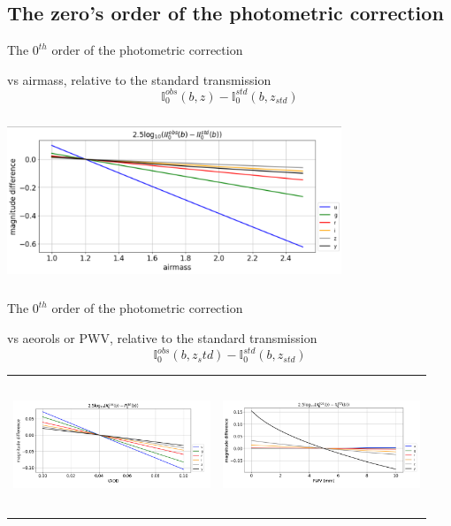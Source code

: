 \documentclass{beamer}
\begin{document}
\subsection{The zero's order of the photometric correction}
\begin{frame}{The $0^{th}$ order of the photometric correction}
\begin{alertblock}{vs airmass, relative to the standard transmission}
\begin{equation}
\mathbb{I}^{obs}_{0}(b,z) - \mathbb{I}^{std}_{0}(b,z_{std})
\end{equation}
\end{alertblock}
\includegraphics[width=10cm, height=5cm]{figs/Integrals_II/Integrals_II0_vs_airmass.png}
\end{frame}


\begin{frame}{The $0^{th}$ order of the photometric correction}
\begin{alertblock}{vs aeorols or PWV, relative to the standard transmission}
\begin{equation}
\mathbb{I}^{obs}_{0}(b,z_std) - \mathbb{I}^{std}_{0}(b,z_{std})
\end{equation}
\end{alertblock}
\begin{tabular}{cc}
\includegraphics[width=5.9cm, height=4cm]{figs/Integrals_II/Integrals_II0_vs_VAOD.png} & \includegraphics[width=5.9cm, height=4cm]{figs/Integrals_II/Integrals_II0_vs_PWV.png}
\end{tabular}
\end{frame}
\end{document}
